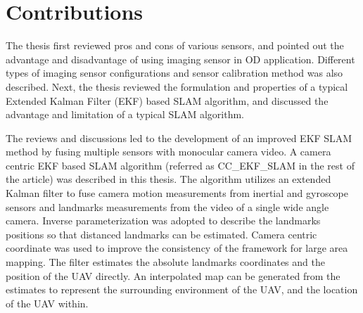 \section{Contributions}\label{section:Contribution}
The thesis first reviewed pros and cons of various sensors, and pointed out the advantage and disadvantage of using
imaging sensor in OD application. Different types of imaging sensor
configurations and sensor calibration method was also described. Next, the
thesis reviewed the formulation and properties of a typical Extended
Kalman Filter (EKF) based SLAM algorithm, and discussed the advantage
and limitation of a typical SLAM algorithm. 

The reviews and discussions led to the development of an improved EKF SLAM
method by fusing multiple sensors with monocular camera video. 
A camera centric EKF based
SLAM algorithm (referred as CC\_EKF\_SLAM in the rest of the article)
was described in this thesis. The algorithm utilizes an extended Kalman
filter to fuse camera motion measurements from inertial and gyroscope
sensors and landmarks measurements from the video of a single wide angle
camera. Inverse parameterization was adopted to describe the landmarks
positions so that distanced landmarks can be estimated. Camera centric coordinate was used to improve the
consistency of the framework for large area mapping. The filter estimates the absolute landmarks coordinates and the position of the UAV directly. An interpolated map can be generated from the estimates to represent the surrounding environment of the UAV, and the location of the UAV within.

